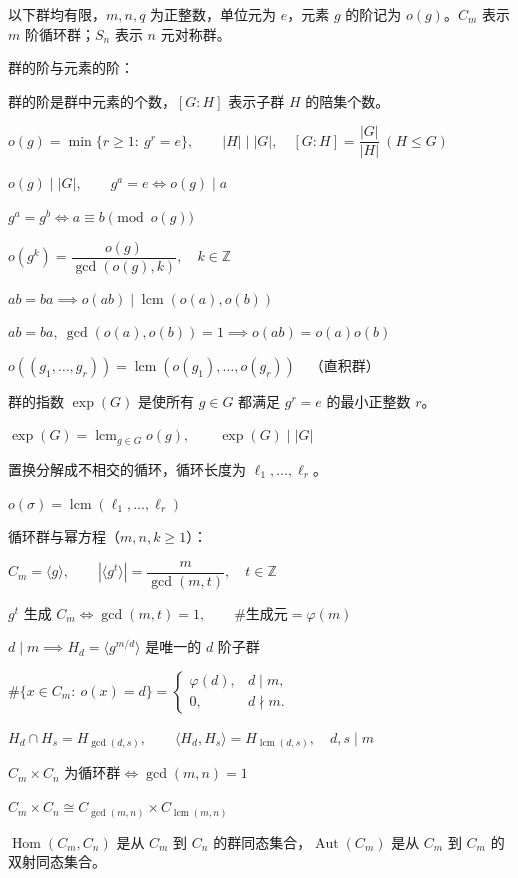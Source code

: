 以下群均有限，$m,n,q$ 为正整数，单位元为 $e$，元素 $g$ 的阶记为 $o(g)$。$C_m$ 表示 $m$ 阶循环群；$S_n$ 表示 $n$ 元对称群。

群的阶与元素的阶：\nopagebreak[4]

群的阶是群中元素的个数，$[G:H]$ 表示子群 $H$ 的陪集个数。

$o(g)=\min\{r\ge1:\ g^r=e\},\qquad|H|\mid|G|,\quad[G:H]=\dfrac{|G|}{|H|}\ (H\le G)$

$o(g)\mid|G|,\qquad g^a=e\iff o(g)\mid a$

$g^a=g^b\iff a\equiv b\pmod{o(g)}$

$o(g^k)=\dfrac{o(g)}{\gcd(o(g),k)},\quad k\in\mathbb Z$

$ab=ba\implies o(ab)\mid\operatorname{lcm}(o(a),o(b))$

$ab=ba,\ \gcd(o(a),o(b))=1\implies o(ab)=o(a)o(b)$

$o((g_1,\dots,g_r))=\operatorname{lcm}(o(g_1),\dots,o(g_r))\quad\text{（直积群）}$

群的指数 $\exp(G)$ 是使所有 $g\in G$ 都满足 $g^r=e$ 的最小正整数 $r$。\nopagebreak[4]

$\exp(G)=\operatorname{lcm}_{g\in G}o(g),\qquad\exp(G)\mid|G|$

置换分解成不相交的循环，循环长度为 $\ell_1,\dots,\ell_r$。\nopagebreak[4]

$o(\sigma)=\operatorname{lcm}(\ell_1,\dots,\ell_r)$

循环群与幂方程（$m,n,k\ge1$）：\nopagebreak[4]

$C_m=\langle g\rangle,\qquad|\langle g^t\rangle|=\dfrac m{\gcd(m,t)},\quad t\in\mathbb Z$

$g^t\text{ 生成 }C_m\iff\gcd(m,t)=1,\qquad\#\text{生成元}=\varphi(m)$

$d\mid m\implies H_d=\langle g^{m/d}\rangle\text{ 是唯一的 $d$ 阶子群}$

$\#\{x\in C_m:\ o(x)=d\}=\begin{cases}\varphi(d),&d\mid m,\\0,&d\nmid m.\end{cases}$

$H_d\cap H_s=H_{\gcd(d,s)},\qquad\langle H_d,H_s\rangle=H_{\operatorname{lcm}(d,s)},\quad d,s\mid m$

$C_m\times C_n\text{ 为循环群}\iff\gcd(m,n)=1$

$C_m\times C_n\cong C_{\gcd(m,n)}\times C_{\operatorname{lcm}(m,n)}$

$\operatorname{Hom}(C_m,C_n)$ 是从 $C_m$ 到 $C_n$ 的群同态集合，$\operatorname{Aut}(C_m)$ 是从 $C_m$ 到 $C_m$ 的双射同态集合。\nopagebreak[4]


